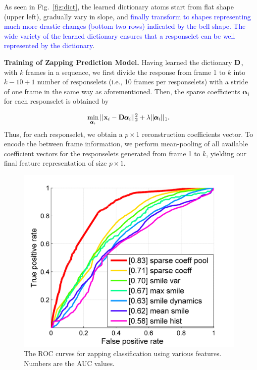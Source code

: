 \documentclass[twoside,leqno,twocolumn]{article}
\newcommand{\SFAdd}[1]{\textcolor{blue}{#1}}
\begin{document}
As seen in Fig.~\ref{fig:dict}, the learned dictionary atoms start from flat shape (upper left), gradually vary in slope, and \SFAdd{finally transform to shapes representing much more drastic changes (bottom two rows) indicated by the bell shape. The wide variety of the learned dictionary ensures that a responselet can be well represented by the dictionary}. 

\noindent \textbf{Training of Zapping Prediction Model.} Having learned the dictionary ${\bf D}$, with $k$ frames in a sequence, we first divide the response from frame 1 to $k$ into $k-10+1$ number of responselets (i.e., 10 frames per responselets) with a stride of one frame in the same way as aforementioned. Then, the sparse coefficients $\pmb\alpha_i$ for each responselet is obtained by

\begin{align}
\label{eq:solve_alpha}
\min_{\pmb\alpha_i} ||{\bf x}_i-{\bf D} \pmb\alpha_i||^2_2 +\lambda ||\pmb\alpha_i||_1.
\end{align}
Thus, for each responselet, we obtain a $p\times 1$ reconstruction coefficients vector. To encode the between frame information, we perform mean-pooling of all available coefficient vectors for the responselets generated from frame 1 to $k$, yielding our final feature representation of size $p\times 1$. 


\begin{figure}[!t]
	\centering
		\includegraphics[width=.8\columnwidth]{fig/cls_performance.png}
	\caption{The ROC curves for zapping classification using various features. Numbers are the AUC values.}
	\label{fig:cls_performance}
\end{figure}
\end{document}
